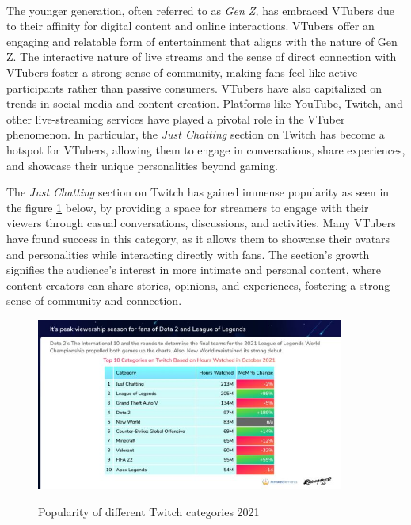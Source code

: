 \\
The younger generation, often referred to as \emph{Gen Z,} has embraced VTubers due to their affinity for digital content and online interactions. 
VTubers offer an engaging and relatable form of entertainment that aligns with the nature of Gen Z. The interactive nature of live streams and the 
sense of direct connection with VTubers foster a strong sense of community, making fans feel like 
active participants rather than passive consumers.
VTubers have also capitalized on trends in social media and content creation. Platforms like YouTube, Twitch, 
and other live-streaming services have played a pivotal role in the VTuber phenomenon. In particular, the \emph{Just Chatting} section on Twitch has become 
a hotspot for VTubers, allowing them to engage in conversations, share experiences, and showcase their unique personalities beyond gaming. \cite{vtubing2}

The \emph{Just Chatting} section on Twitch has gained immense popularity as seen in the figure \ref{fig:justchattwitch} below, by providing a space for 
streamers to engage with their viewers through casual conversations, discussions, and activities. Many VTubers have found success in this category, as 
it allows them to showcase their avatars and personalities while interacting directly with fans. The section's growth signifies the audience's 
interest in more intimate and personal content, where content creators can share stories, opinions, and experiences, fostering a strong sense of community and connection.
\\
\begin{figure}[htb]
    \centering
    \includegraphics[width=0.9\textwidth]{pics/justchattwitch.jpg}
    \caption{Popularity of different Twitch categories 2021}
    \cite{geekwire}
    \label{fig:justchattwitch}
\end{figure}
\\
